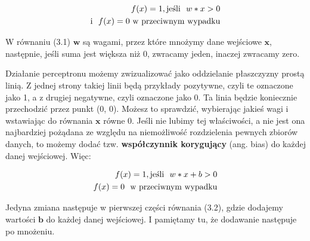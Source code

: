 \begin{equation}
\begin{split}
f(x) = 1, \textrm{jeśli \space} w * x > 0
\\
\textrm{i \space} f(x) = 0 \textrm{\space w przeciwnym wypadku}
\end{split}
\end{equation}

\noindent W równaniu (3.1) $\boldsymbol{w}$ są wagami, przez które mnożymy dane wejściowe $\boldsymbol{x}$, następnie, jeśli suma jest większa niż 0, zwracamy jeden, inaczej zwracamy zero.\newline

Działanie perceptronu możemy zwizualizować jako oddzielanie płaszczyzny prostą linią. Z jednej strony takiej linii będą przykłady pozytywne, czyli te oznaczone jako 1, a z drugiej negatywne, czyli oznaczone jako 0. Ta linia będzie koniecznie przechodzić przez punkt (0, 0). Możesz to sprawdzić, wybierając jakieś wagi i wstawiając do równania $\boldsymbol{x}$ równe 0. Jeśli nie lubimy tej właściwości, a nie jest ona najbardziej pożądana ze względu na niemożliwość rozdzielenia pewnych zbiorów danych, to możemy dodać tzw. \textbf{współczynnik korygujący} (ang. bias) do każdej danej wejściowej. Więc:

\begin{equation}
\begin{split}
f(x) = 1, \textrm{jeśli \space} w * x + b > 0
\\
f(x) = 0 \textrm{ \space w przeciwnym wypadku}
\end{split}
\end{equation}

\noindent Jedyna zmiana następuje w pierwszej części równania (3.2), gdzie dodajemy wartości $\boldsymbol{b}$ do każdej danej wejściowej. I pamiętamy tu, że dodawanie następuje po mnożeniu.\newline

